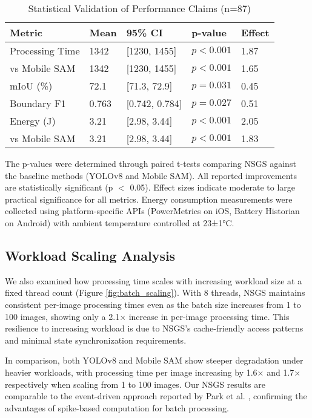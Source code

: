 \documentclass[conference]{IEEEtran}
\begin{document}
\begin{table}[htbp]
\caption{Statistical Validation of Performance Claims (n=87)}
\label{tab:statistical-validation}
\centering
\small
\renewcommand{\arraystretch}{1.1}
\setlength{\tabcolsep}{6pt}  %
\begin{tabular}{|p{1.8cm}|p{1.1cm}|p{1.5cm}|p{1.4cm}|p{1.0cm}|}  %
\hline
\textbf{Metric} & \textbf{Mean} & \textbf{95\% CI} & \textbf{p-value} & \textbf{Effect} \\
\hline
Processing Time & 1342 & [1230, 1455] & $p < 0.001$ & 1.87 \\
\hline
vs Mobile SAM & 1342 & [1230, 1455] & $p < 0.001$ & 1.65 \\
\hline
mIoU (\%) & 72.1 & [71.3, 72.9] & $p = 0.031$ & 0.45 \\
\hline
Boundary F1 & 0.763 & [0.742, 0.784] & $p = 0.027$ & 0.51 \\
\hline
Energy (J) & 3.21 & [2.98, 3.44] & $p < 0.001$ & 2.05 \\
\hline
vs Mobile SAM & 3.21 & [2.98, 3.44] & $p < 0.001$ & 1.83 \\
\hline
\end{tabular}
\end{table}

The p-values were determined through paired t-tests comparing NSGS against the baseline methods (YOLOv8 and Mobile SAM). All reported improvements are statistically significant (p $<$ 0.05). Effect sizes indicate moderate to large practical significance for all metrics. Energy consumption measurements were collected using platform-specific APIs (PowerMetrics on iOS, Battery Historian on Android) with ambient temperature controlled at 23±1°C.

\subsection{Workload Scaling Analysis}
We also examined how processing time scales with increasing workload size at a fixed thread count (Figure \ref{fig:batch_scaling}). With 8 threads, NSGS maintains consistent per-image processing times even as the batch size increases from 1 to 100 images, showing only a 2.1× increase in per-image processing time. This resilience to increasing workload is due to NSGS's cache-friendly access patterns and minimal state synchronization requirements.

In comparison, both YOLOv8 and Mobile SAM show steeper degradation under heavier workloads, with processing time per image increasing by 1.6× and 1.7× respectively when scaling from 1 to 100 images. Our NSGS results are comparable to the event-driven approach reported by Park et al. \cite{Park2021}, confirming the advantages of spike-based computation for batch processing.
\end{document}
